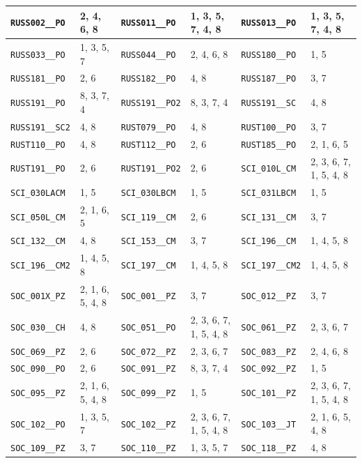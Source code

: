 \begin{longtable}{|l|l||l|l||l|l|}
    \verb|RUSS002__PO| & 2, 4, 6, 8 & \verb|RUSS011__PO| & 1, 3, 5, 7, 4, 8 & \verb|RUSS013__PO| & 1, 3, 5, 7, 4, 8\\\hline
    \verb|RUSS033__PO| & 1, 3, 5, 7 & \verb|RUSS044__PO| & 2, 4, 6, 8 & \verb|RUSS180__PO| & 1, 5\\\hline
    \verb|RUSS181__PO| & 2, 6 & \verb|RUSS182__PO| & 4, 8 & \verb|RUSS187__PO| & 3, 7\\\hline
    \verb|RUSS191__PO| & 8, 3, 7, 4 & \verb|RUSS191__PO2| & 8, 3, 7, 4 & \verb|RUSS191__SC| & 4, 8\\\hline
    \verb|RUSS191__SC2| & 4, 8 & \verb|RUST079__PO| & 4, 8 & \verb|RUST100__PO| & 3, 7\\\hline
    \verb|RUST110__PO| & 4, 8 & \verb|RUST112__PO| & 2, 6 & \verb|RUST185__PO| & 2, 1, 6, 5\\\hline
    \verb|RUST191__PO| & 2, 6 & \verb|RUST191__PO2| & 2, 6 & \verb|SCI_010L_CM| & 2, 3, 6, 7, 1, 5, 4, 8\\\hline
    \verb|SCI_030LACM| & 1, 5 & \verb|SCI_030LBCM| & 1, 5 & \verb|SCI_031LBCM| & 1, 5\\\hline
    \verb|SCI_050L_CM| & 2, 1, 6, 5 & \verb|SCI_119__CM| & 2, 6 & \verb|SCI_131__CM| & 3, 7\\\hline
    \verb|SCI_132__CM| & 4, 8 & \verb|SCI_153__CM| & 3, 7 & \verb|SCI_196__CM| & 1, 4, 5, 8\\\hline
    \verb|SCI_196__CM2| & 1, 4, 5, 8 & \verb|SCI_197__CM| & 1, 4, 5, 8 & \verb|SCI_197__CM2| & 1, 4, 5, 8\\\hline
    \verb|SOC_001X_PZ| & 2, 1, 6, 5, 4, 8 & \verb|SOC_001__PZ| & 3, 7 & \verb|SOC_012__PZ| & 3, 7\\\hline
    \verb|SOC_030__CH| & 4, 8 & \verb|SOC_051__PO| & 2, 3, 6, 7, 1, 5, 4, 8 & \verb|SOC_061__PZ| & 2, 3, 6, 7\\\hline
    \verb|SOC_069__PZ| & 2, 6 & \verb|SOC_072__PZ| & 2, 3, 6, 7 & \verb|SOC_083__PZ| & 2, 4, 6, 8\\\hline
    \verb|SOC_090__PO| & 2, 6 & \verb|SOC_091__PZ| & 8, 3, 7, 4 & \verb|SOC_092__PZ| & 1, 5\\\hline
    \verb|SOC_095__PZ| & 2, 1, 6, 5, 4, 8 & \verb|SOC_099__PZ| & 1, 5 & \verb|SOC_101__PZ| & 2, 3, 6, 7, 1, 5, 4, 8\\\hline
    \verb|SOC_102__PO| & 1, 3, 5, 7 & \verb|SOC_102__PZ| & 2, 3, 6, 7, 1, 5, 4, 8 & \verb|SOC_103__JT| & 2, 1, 6, 5, 4, 8\\\hline
    \verb|SOC_109__PZ| & 3, 7 & \verb|SOC_110__PZ| & 1, 3, 5, 7 & \verb|SOC_118__PZ| & 4, 8\\\hline

\end{longtable}
